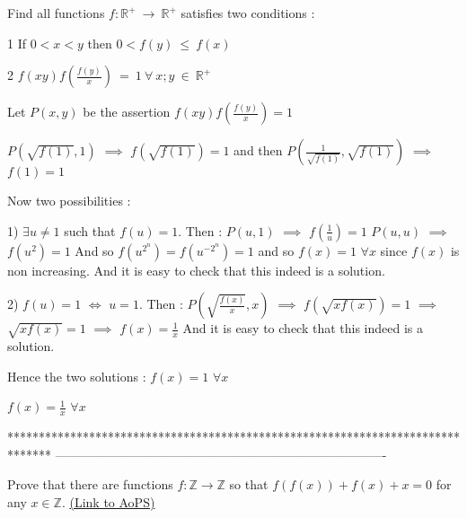 \begin{solution}
	\begin{tcolorbox}Find all functions $ f : \mathbb{R^{ + }} \ \to \ \mathbb{R^{ + }}$ satisfies two conditions :

1 \/ If $ 0 < x < y$ then $ 0 < f(y) \ \leq \ f(x)$

 2 \/ $ f(xy) f \left( \frac {f(y)}{x} \right) \ = \ 1 \ \forall \ x;y \ \in \ \mathbb{R^{ + }}$\end{tcolorbox}

Let $ P(x,y)$ be the assertion $ f(xy)f(\frac{f(y)}x)=1$

$ P(\sqrt{f(1)},1)$ $ \implies$ $ f(\sqrt{f(1)})=1$ and then $ P(\frac 1{\sqrt{f(1)}},\sqrt{f(1)})$ $ \implies$ $ f(1)=1$

Now two possibilities :

1) $ \exists u\neq 1$ such that $ f(u)=1$. Then :
$ P(u,1)$ $ \implies$ $ f(\frac 1u)=1$
$ P(u,u)$ $ \implies$ $ f(u^2)=1$
And so $ f(u^{2^n})=f(u^{-2^n})=1$ and so $ f(x)=1$ $ \forall x$ since $ f(x)$ is non increasing.
And it is easy to check that this indeed is a solution.

2) $ f(u)=1$ $ \iff$ $ u=1$. Then :
$ P(\sqrt{\frac{f(x)}x},x)$ $ \implies$ $ f(\sqrt{xf(x)})=1$ $ \implies$ $ \sqrt{xf(x)}=1$ $ \implies$ $ f(x)=\frac 1x$
And it is easy to check that this indeed is a solution.

Hence the two solutions :
$ f(x)=1$ $ \forall x$

$ f(x)=\frac 1x$ $ \forall x$
\end{solution}
*******************************************************************************
-------------------------------------------------------------------------------

\begin{problem}
	Prove that there are functions $ f: \mathbb{Z} \rightarrow \mathbb{Z}$ so that $ f(f(x))+f(x)+x=0$ for any $ x \in \mathbb{Z}$.
	\flushright \href{https://artofproblemsolving.com/community/c6h298482}{(Link to AoPS)}
\end{problem}



